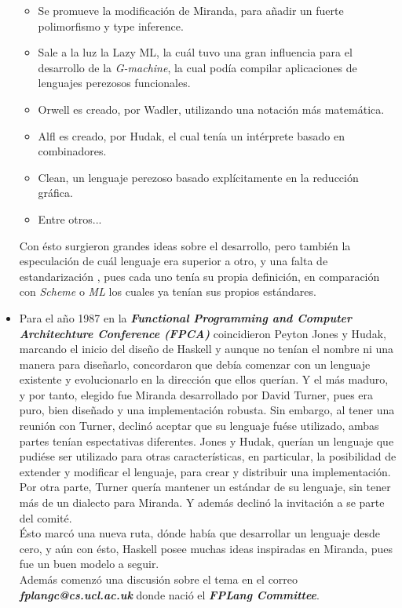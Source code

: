\documentclass{article}
\begin{document}
\begin{itemize}
		\begin{itemize}
			\item Se promueve la modificación de Miranda, para añadir un fuerte polimorfismo y type inference.
			\item Sale a la luz la Lazy ML, la cuál tuvo una gran influencia para el desarrollo de la \textit{G-machine}, la cual podía compilar aplicaciones de  lenguajes perezosos funcionales.
			\item Orwell es creado, por Wadler, utilizando una notación más matemática.
			\item Alfl es creado, por Hudak, el cual tenía un intérprete basado en combinadores.
			\item Clean, un lenguaje perezoso basado explícitamente en la reducción gráfica.
			\item Entre otros...
		\end{itemize}
	Con ésto surgieron grandes ideas sobre el desarrollo, pero también la especulación de cuál lenguaje era superior a otro, y una falta de estandarización , pues cada uno tenía su propia definición, en comparación con \textit{Scheme} o \textit{ML} los cuales ya tenían sus propios estándares.
	\item Para el año 1987 en la \textbf{\textit{Functional Programming and Computer Architechture Conference (FPCA)}} coincidieron Peyton Jones y Hudak, marcando el inicio del diseño de Haskell y aunque no tenían el nombre ni una manera para diseñarlo, concordaron que debía comenzar con un lenguaje existente y evolucionarlo en la dirección que ellos querían. Y el más maduro, y por tanto, elegido fue Miranda desarrollado por David Turner, pues era puro, bien diseñado y una implementación robusta. Sin embargo, al tener una reunión con Turner, declinó aceptar que su lenguaje fuése utilizado, ambas partes tenían espectativas diferentes. Jones y Hudak, querían un lenguaje que pudiése ser utilizado para otras características, en particular, la posibilidad de extender y modificar el lenguaje, para crear y distribuir una implementación. Por otra parte, Turner quería mantener un estándar de su lenguaje, sin tener más de un dialecto para Miranda. Y además declinó la invitación a se parte del comité.\\Ésto marcó una nueva ruta, dónde había que desarrollar un lenguaje desde cero, y aún con ésto, Haskell posee muchas ideas inspiradas en Miranda, pues fue un buen modelo a seguir.\\Además comenzó una discusión sobre el tema en el correo \textbf{\textit{fplangc@cs.ucl.ac.uk}} donde nació el \textbf{\textit{FPLang Committee}}.

\end{itemize}
\end{document}
